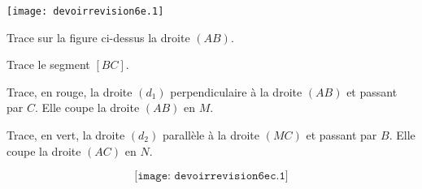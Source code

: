 \begin{center}
  \texttt{[image: devoirrevision6e.1]}
\end{center}
\begin{myenumerate}
  \item Trace sur la figure ci-dessus la droite $(AB)$.
  \item Trace le segment $[BC]$.
  \item Trace, en rouge, la droite $(d_1)$ perpendiculaire à la droite
    $(AB)$ et passant par $C$. Elle coupe la droite $(AB)$ en $M$.
  \item Trace, en vert, la droite $(d_2)$ parallèle à la droite $(MC)$
    et passant par $B$. Elle coupe la droite $(AC)$ en $N$.
\end{myenumerate}
\[\texttt{[image: devoirrevision6ec.1]}\]